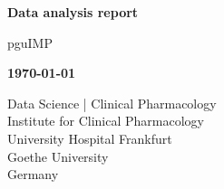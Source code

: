 \begin{titlepage}
   \begin{center}
       \vspace*{1cm}

       \textbf{Data analysis report}

       \vspace{0.5cm}
        pguIMP

       \vspace{1.5cm}

       \textbf{\today}

       \vfill

       \vspace{0.8cm}


       \vspace{0.8cm}
       \vfill

       Data Science | Clinical Pharmacology\\
       Institute for Clinical Pharmacology\\
       University Hospital Frankfurt\\
       Goethe University\\
       Germany

   \end{center}
\end{titlepage}


